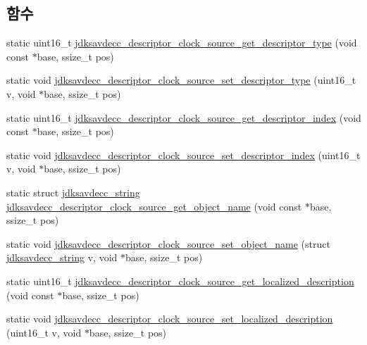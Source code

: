 \subsection*{함수}
\begin{DoxyCompactItemize}
\item 
static uint16\+\_\+t \hyperlink{group__descriptor__clock__source_ga6c7920cb81e474c039654579add3f6f9}{jdksavdecc\+\_\+descriptor\+\_\+clock\+\_\+source\+\_\+get\+\_\+descriptor\+\_\+type} (void const $\ast$base, ssize\+\_\+t pos)
\item 
static void \hyperlink{group__descriptor__clock__source_gadcd251411481a9b091f8ef48cd421212}{jdksavdecc\+\_\+descriptor\+\_\+clock\+\_\+source\+\_\+set\+\_\+descriptor\+\_\+type} (uint16\+\_\+t v, void $\ast$base, ssize\+\_\+t pos)
\item 
static uint16\+\_\+t \hyperlink{group__descriptor__clock__source_ga5b543a9b01054f53161de607189cacb7}{jdksavdecc\+\_\+descriptor\+\_\+clock\+\_\+source\+\_\+get\+\_\+descriptor\+\_\+index} (void const $\ast$base, ssize\+\_\+t pos)
\item 
static void \hyperlink{group__descriptor__clock__source_ga648147aa20532f66bb9c71af6f68d515}{jdksavdecc\+\_\+descriptor\+\_\+clock\+\_\+source\+\_\+set\+\_\+descriptor\+\_\+index} (uint16\+\_\+t v, void $\ast$base, ssize\+\_\+t pos)
\item 
static struct \hyperlink{structjdksavdecc__string}{jdksavdecc\+\_\+string} \hyperlink{group__descriptor__clock__source_ga589f9dc289f33c7d3998698d7f3fb096}{jdksavdecc\+\_\+descriptor\+\_\+clock\+\_\+source\+\_\+get\+\_\+object\+\_\+name} (void const $\ast$base, ssize\+\_\+t pos)
\item 
static void \hyperlink{group__descriptor__clock__source_gae3b1d7c700771e3bd3534af50808ad9f}{jdksavdecc\+\_\+descriptor\+\_\+clock\+\_\+source\+\_\+set\+\_\+object\+\_\+name} (struct \hyperlink{structjdksavdecc__string}{jdksavdecc\+\_\+string} v, void $\ast$base, ssize\+\_\+t pos)
\item 
static uint16\+\_\+t \hyperlink{group__descriptor__clock__source_ga850b9367642cb78513cd08cbcebca2e4}{jdksavdecc\+\_\+descriptor\+\_\+clock\+\_\+source\+\_\+get\+\_\+localized\+\_\+description} (void const $\ast$base, ssize\+\_\+t pos)
\item 
static void \hyperlink{group__descriptor__clock__source_gaf5c113a55cc5fcdc8db25b91bd9a0b75}{jdksavdecc\+\_\+descriptor\+\_\+clock\+\_\+source\+\_\+set\+\_\+localized\+\_\+description} (uint16\+\_\+t v, void $\ast$base, ssize\+\_\+t pos)
\item 

\end{DoxyCompactItemize}

